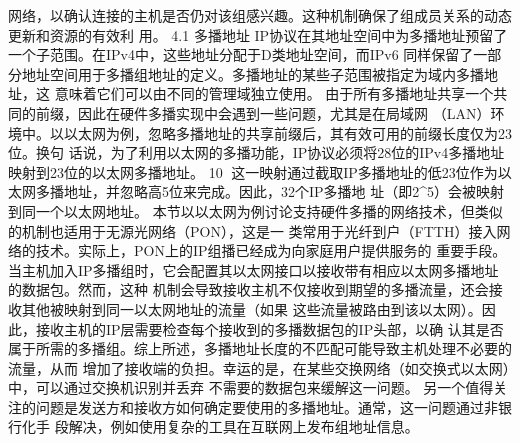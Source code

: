 网络，以确认连接的主机是否仍对该组感兴趣。这种机制确保了组成员关系的动态更新和资源的有效利
用。
4.1 多播地址
IP协议在其地址空间中为多播地址预留了一个子范围。在IPv4中，这些地址分配于D类地址空间，而IPv6
同样保留了一部分地址空间用于多播组地址的定义。多播地址的某些子范围被指定为域内多播地址，这
意味着它们可以由不同的管理域独立使用。
由于所有多播地址共享一个共同的前缀，因此在硬件多播实现中会遇到一些问题，尤其是在局域网
（LAN）环境中。以以太网为例，忽略多播地址的共享前缀后，其有效可用的前缀长度仅为23位。换句
话说，为了利用以太网的多播功能，IP协议必须将28位的IPv4多播地址映射到23位的以太网多播地址。
                                                  10
这一映射通过截取IP多播地址的低23位作为以太网多播地址，并忽略高5位来完成。因此，32个IP多播地
址（即2^5）会被映射到同一个以太网地址。
本节以以太网为例讨论支持硬件多播的网络技术，但类似的机制也适用于无源光网络（PON），这是一
类常用于光纤到户（FTTH）接入网络的技术。实际上，PON上的IP组播已经成为向家庭用户提供服务的
重要手段。
当主机加入IP多播组时，它会配置其以太网接口以接收带有相应以太网多播地址的数据包。然而，这种
机制会导致接收主机不仅接收到期望的多播流量，还会接收其他被映射到同一以太网地址的流量（如果
这些流量被路由到该以太网）。因此，接收主机的IP层需要检查每个接收到的多播数据包的IP头部，以确
认其是否属于所需的多播组。综上所述，多播地址长度的不匹配可能导致主机处理不必要的流量，从而
增加了接收端的负担。幸运的是，在某些交换网络（如交换式以太网）中，可以通过交换机识别并丢弃
不需要的数据包来缓解这一问题。
另一个值得关注的问题是发送方和接收方如何确定要使用的多播地址。通常，这一问题通过非银行化手
段解决，例如使用复杂的工具在互联网上发布组地址信息。


